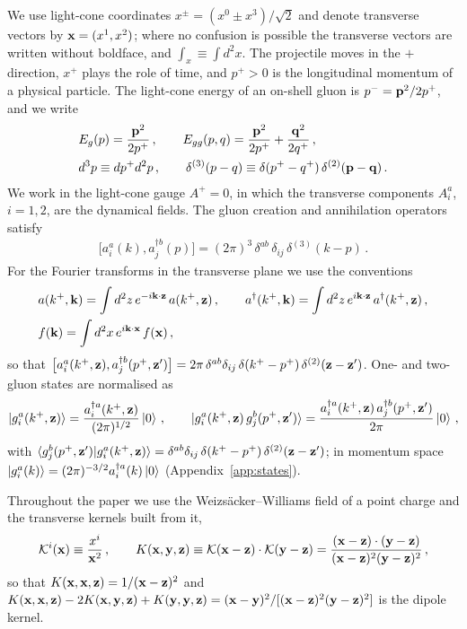 We use light-cone coordinates $x^\pm=(x^0\pm x^3)/\sqrt2$ and denote transverse vectors by $\mathbf{x}=(x^1,x^2)$; where no confusion is possible the transverse vectors are written without boldface, and $\int_{x}\equiv\int d^2x$. The projectile moves in the $+$ direction, $x^+$ plays the role of time, and $p^+>0$ is the longitudinal momentum of a physical particle. The light-cone energy of an on-shell gluon is $p^-=\mathbf{p}^2/2p^+$, and we write
\begin{align}
&E_g(p)=\frac{\mathbf{p}^2}{2p^+}\,,\qquad E_{gg}(p,q)=\frac{\mathbf{p}^2}{2p^+}+\frac{\mathbf{q}^2}{2q^+}\,,\notag\\ &d^3p\equiv dp^+d^2p\,,\qquad \delta^{(3)}(p-q)\equiv\delta(p^+-q^+)\,\delta^{(2)}(\mathbf{p}-\mathbf{q})\,.
\end{align}
We work in the light-cone gauge $A^+=0$, in which the transverse components $A_i^a$, $i=1,2$, are the dynamical fields. The gluon creation and annihilation operators satisfy
\begin{align}\label{eq:aadagger}
\big[a^a_i(k),a^{\dagger b}_j(p)\big]=(2\pi)^3\,\delta^{ab}\,\delta_{ij}\,\delta^{(3)}(k-p)\,.
\end{align}
For the Fourier transforms in the transverse plane we use the conventions
\begin{align}\label{eq:FTconventions}
&a(k^+,\mathbf{k})=\int d^2z\,e^{-i\mathbf{k}\cdot\mathbf{z}}\,a(k^+,\mathbf{z})\,,\qquad
a^\dagger(k^+,\mathbf{k})=\int d^2z\,e^{i\mathbf{k}\cdot\mathbf{z}}\,a^\dagger(k^+,\mathbf{z})\,,\notag\\
&f(\mathbf{k})=\int d^2x\,e^{i\mathbf{k}\cdot\mathbf{x}}\,f(\mathbf{x})\,,
\end{align}
so that $\big[a^a_i(k^+,\mathbf{z}),a^{\dagger b}_j(p^+,\mathbf{z}')\big]=2\pi\,\delta^{ab}\delta_{ij}\,\delta(k^+-p^+)\,\delta^{(2)}(\mathbf{z}-\mathbf{z}')$. One- and two-gluon states are normalised as
\begin{align}\label{eq:states}
\ket{g^a_i(k^+,\mathbf{z})}=\frac{a^{\dagger a}_i(k^+,\mathbf{z})}{(2\pi)^{1/2}}\ket{0}\,,\qquad
\ket{g^a_i(k^+,\mathbf{z})\,g^b_j(p^+,\mathbf{z}')}=\frac{a^{\dagger a}_i(k^+,\mathbf{z})\,a^{\dagger b}_j(p^+,\mathbf{z}')}{2\pi}\ket{0}\,,
\end{align}
with $\braket{g^b_j(p^+,\mathbf{z}')|g^a_i(k^+,\mathbf{z})}=\delta^{ab}\delta_{ij}\,\delta(k^+-p^+)\,\delta^{(2)}(\mathbf{z}-\mathbf{z}')$; in momentum space $\ket{g^a_i(k)}=(2\pi)^{-3/2}a^{\dagger a}_i(k)\ket0$ (Appendix~\ref{app:states}).

Throughout the paper we use the Weizs\"acker--Williams field of a point charge and the transverse kernels built from it,
\begin{align}\label{eq:kernels}
\mathcal{K}^i(\mathbf{x})\equiv\frac{x^i}{\mathbf{x}^2}\,,\qquad
K(\mathbf{x},\mathbf{y},\mathbf{z})\equiv\mathcal{K}(\mathbf{x}-\mathbf{z})\cdot\mathcal{K}(\mathbf{y}-\mathbf{z})=\frac{(\mathbf{x}-\mathbf{z})\cdot(\mathbf{y}-\mathbf{z})}{(\mathbf{x}-\mathbf{z})^2(\mathbf{y}-\mathbf{z})^2}\,,
\end{align}
so that $K(\mathbf{x},\mathbf{x},\mathbf{z})=1/(\mathbf{x}-\mathbf{z})^2$ and $K(\mathbf{x},\mathbf{x},\mathbf{z})-2K(\mathbf{x},\mathbf{y},\mathbf{z})+K(\mathbf{y},\mathbf{y},\mathbf{z})=(\mathbf{x}-\mathbf{y})^2/[(\mathbf{x}-\mathbf{z})^2(\mathbf{y}-\mathbf{z})^2]$ is the dipole kernel.

